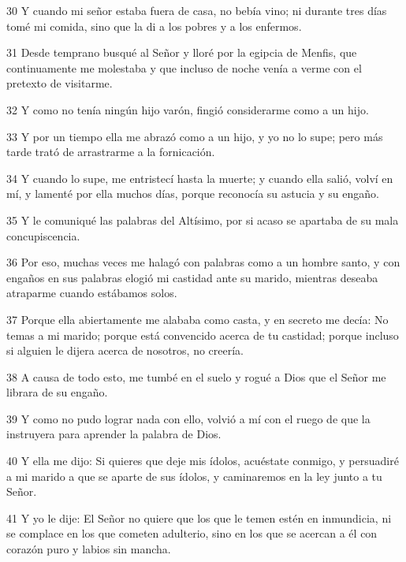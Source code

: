 \par 30 Y cuando mi señor estaba fuera de casa, no bebía vino; ni durante tres días tomé mi comida, sino que la di a los pobres y a los enfermos.

\par 31 Desde temprano busqué al Señor y lloré por la egipcia de Menfis, que continuamente me molestaba y que incluso de noche venía a verme con el pretexto de visitarme.

\par 32 Y como no tenía ningún hijo varón, fingió considerarme como a un hijo.

\par 33 Y por un tiempo ella me abrazó como a un hijo, y yo no lo supe; pero más tarde trató de arrastrarme a la fornicación.

\par 34 Y cuando lo supe, me entristecí hasta la muerte; y cuando ella salió, volví en mí, y lamenté por ella muchos días, porque reconocía su astucia y su engaño.

\par 35 Y le comuniqué las palabras del Altísimo, por si acaso se apartaba de su mala concupiscencia.

\par 36 Por eso, muchas veces me halagó con palabras como a un hombre santo, y con engaños en sus palabras elogió mi castidad ante su marido, mientras deseaba atraparme cuando estábamos solos.

\par 37 Porque ella abiertamente me alababa como casta, y en secreto me decía: No temas a mi marido; porque está convencido acerca de tu castidad; porque incluso si alguien le dijera acerca de nosotros, no creería.

\par 38 A causa de todo esto, me tumbé en el suelo y rogué a Dios que el Señor me librara de su engaño.

\par 39 Y como no pudo lograr nada con ello, volvió a mí con el ruego de que la instruyera para aprender la palabra de Dios.

\par 40 Y ella me dijo: Si quieres que deje mis ídolos, acuéstate conmigo, y persuadiré a mi marido a que se aparte de sus ídolos, y caminaremos en la ley junto a tu Señor.

\par 41 Y yo le dije: El Señor no quiere que los que le temen estén en inmundicia, ni se complace en los que cometen adulterio, sino en los que se acercan a él con corazón puro y labios sin mancha.

